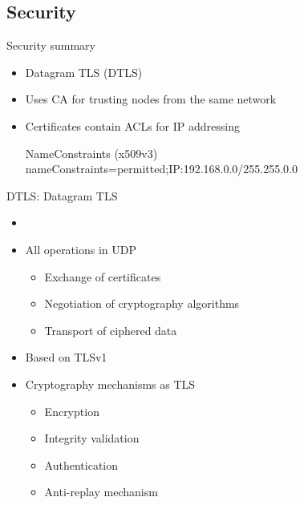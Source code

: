 \documentclass{beamer}
\begin{document}
\subsection{Security}
\begin{frame}{Security summary}
	\begin{itemize}
	\item Datagram TLS (DTLS)
	\item Uses CA for trusting nodes from the same network
	\item Certificates contain ACLs for IP addressing
	\begin{block}{NameConstraints (x509v3)}
	nameConstraints=permitted;IP:192.168.0.0/255.255.0.0
	\end{block}
	\end{itemize}
\end{frame}
\begin{frame}{DTLS: Datagram TLS}
	\begin{itemize}
	\item\begin{thebibliography}\beamertemplatearticlebibitems
	\item RFC 4347
	\end{thebibliography}
	\item All operations in UDP
		\begin{itemize}
		\item Exchange of certificates
		\item Negotiation of cryptography algorithms
		\item Transport of ciphered data
		\end{itemize}
	\item Based on TLSv1
	\item Cryptography mechanisms as TLS 
		\begin{itemize}
		\item Encryption
		\item Integrity validation
		\item Authentication
		\item Anti-replay mechanism
		\end{itemize}
	\end{itemize}
\end{frame}
\end{document}
